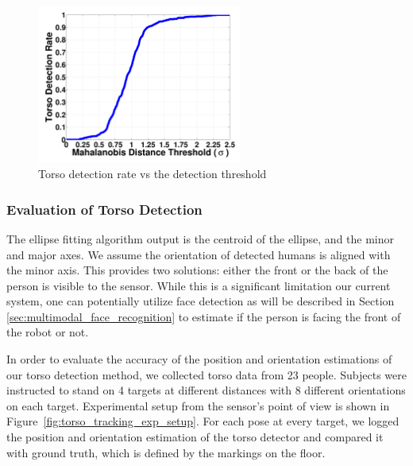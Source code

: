 \begin{figure}[ht!]
\centering
\includegraphics[width=0.6\textwidth]{pics/torso_detection_rate}
\caption{Torso detection rate vs the detection threshold}
\label{fig:torso_detection_rate}
\end{figure}

\subsubsection{Evaluation of Torso Detection}

The ellipse fitting algorithm output is the centroid of the ellipse, and the minor and major axes. We assume the orientation of detected humans is aligned with the minor axis. This provides two solutions: either the front or the back of the person is visible to the sensor. While this is a significant limitation our current system, one can potentially utilize face detection as will be described in Section \ref{sec:multimodal_face_recognition} to estimate if the person is facing the front of the robot or not.

In order to evaluate the accuracy of the position and orientation estimations of our torso detection method, we collected torso data from 23 people. Subjects were instructed to stand on 4 targets at different distances with 8 different orientations on each target. Experimental setup from the sensor's point of view is shown in Figure~\ref{fig:torso_tracking_exp_setup}. For each pose at every target, we logged the position and orientation estimation of the torso detector and compared it with ground truth, which is defined by the markings on the floor.

